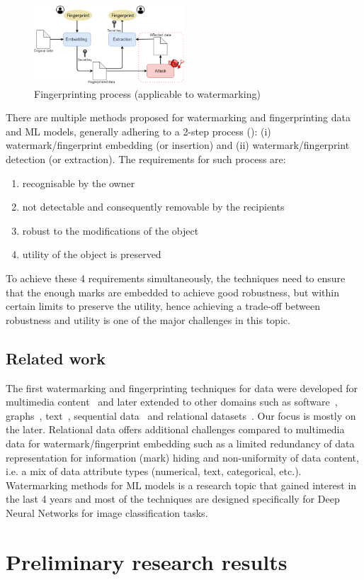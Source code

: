 \documentclass[conference]{IEEEtran}
\begin{document}
\begin{figure}
    \centering
    \includegraphics[width=0.5\textwidth]{figures/fingerprint-process.png}
    \caption{Fingerprinting process (applicable to watermarking)}
    \label{fig:process}
\end{figure}

There are multiple methods proposed for watermarking and fingerprinting data and ML models, generally adhering to a 2-step process (): (i) watermark/fingerprint embedding (or insertion) and (ii) watermark/fingerprint detection (or extraction). 
The requirements for such process are:
\begin{enumerate}
    \item recognisable by the owner
    \item not detectable and consequently removable by the recipients
    \item robust to the modifications of the object
    \item utility of the object is preserved
\end{enumerate}
To achieve these 4 requirements simultaneously, the techniques need to ensure that the enough marks are embedded to achieve good robustness, but within certain limits to preserve the utility, hence achieving a trade-off between robustness and utility is one of the major challenges in this topic. 

\subsection{Related work}
The first watermarking and fingerprinting techniques for data were developed for multimedia content~\cite{} and later extended to other domains such as software~\cite{}, graphs~\cite{}, text~\cite{}, sequential data~\cite{} and relational datasets~\cite{}. 
Our focus is mostly on the later. 
Relational data offers additional challenges compared to multimedia data for watermark/fingerprint embedding such as a limited redundancy of data representation for information (mark) hiding and non-uniformity of data content, i.e. a mix of data attribute types (numerical, text, categorical, etc.). 
Watermarking methods for ML models is a research topic that gained interest in the last 4 years and most of the techniques are designed specifically for Deep Neural Networks for image classification tasks. 

\section{Preliminary research results}



\end{document}
